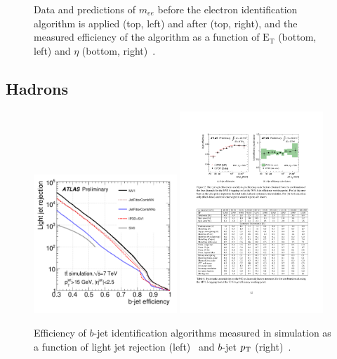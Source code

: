 \begin{figure}[tp]
  \caption{Data and predictions of $m_{ee}$ before the electron identification algorithm is applied (top, left) and after (top, right), and the measured efficiency of the algorithm as a function of $\text{E}_\text{T}$ (bottom, left) and $\eta$ (bottom, right)~\cite{ATLAS-CONF-2014-032}.}
  \label{fig:objects-electron}
\end{figure}

\subsection{Hadrons}

\begin{figure}[tp]
  \centering
  \includegraphics[width=0.48\textwidth]{figures/performance/btag-ROC}
  \includegraphics[width=0.48\textwidth]{figures/performance/btag-signalefficiency}
  \caption{Efficiency of $b$-jet identification algorithms measured in simulation as a function of light jet rejection (left)~\cite{ATLAS-CONF-2012-043} and $b$-jet $p_{\mathrm{T}}$ (right)~\cite{ATLAS-CONF-2014-004}.}
  \label{fig:objects-btag}
\end{figure}

